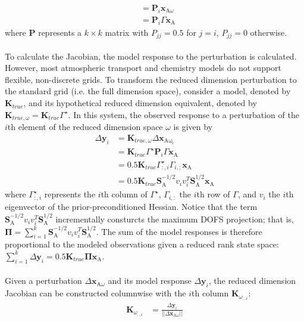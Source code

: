 \documentclass{article}
\newcommand{\g}{\Gamma}
\newcommand{\gstar}{\Gamma^{\star}}
\newcommand{\xa}{\mathbf{x}_{\mathrm{A}}}
\newcommand{\y}{\mathbf{y}}
\newcommand{\K}{\mathbf{K}}
\newcommand{\sa}{\mathbf{S}_{\mathrm{A}}}
\begin{document}
{{\begin{align}
&= \mathbf{P}_i\mathbf{x}_{\mathrm{A}\omega}\\
&=\mathbf{P}_i\g\xa%
\end{align}
where $\mathbf{P}$ represents a $k \times k$ matrix with $P_{jj} = 0.5$ for $j = i$, $P_{jj} = 0$ otherwise.\\ %
\\
To calculate the Jacobian, the model response to the perturbation is calculated. However, most atmospheric transport and chemistry models do not support flexible, non-discrete grids. To transform the reduced dimension perturbation to the standard grid (i.e. the full dimension space), consider a model, denoted by $\K_{true}$, and its hypothetical reduced dimension equivalent, denoted by $\K_{true,\omega} = \K_{true}\gstar$. In this system, the observed response to a perturbation of the $i$th element of the reduced dimension space $\omega$ is given by 
\begin{align*}
	\Delta\y_i &= \K_{true,\omega}\Delta\mathbf{x}_{\mathrm{A\omega_i}}\\
	&= \K_{true}\gstar\mathbf{P}_i\g\xa\\
	&= 0.5\K_{true}\gstar_{:,i}\g_{i,:}\xa\\
	&= 0.5\K_{true}\sa^{-1/2}v_i v_i^T\sa^{1/2}\xa
\end{align*}
where $\gstar_{:,i}$ represents the $i$th column of $\gstar$, $\g_{i,:}$ the $i$th row of $\g$, and $v_i$ the $i$th eigenvector of the prior-preconditioned Hessian. Notice that the term $\sa^{-1/2}v_i v_i^T\sa^{1/2}$ incrementally consturcts the maximum DOFS projection; that is, $\mathbf{\Pi} = \sum_{i=1}^{k}\sa^{-1/2}v_i v_i^T\sa^{1/2}$. The sum of the model responses is therefore proportional to the modeled observations given a reduced rank state space: $\sum_{i = 1}^{k}\Delta \y_i = 0.5\K_{true}\mathbf{\Pi}\xa$.\\
\\
Given a perturbation $\Delta \mathbf{x}_{\mathrm{A}\omega}$ and its model response $\Delta\y_i$, the reduced dimension Jacobian can be constructed columnwise with the $i$th column $\K_{\omega_{:,i}}$:
\begin{align*}
	\K_{\omega_{:,i}} &= \frac{\Delta\y_i}{\vert\vert\Delta \mathbf{x}_{\mathrm{A}\omega}\vert\vert}

\end{align*}}}
\end{document}
